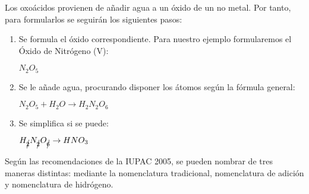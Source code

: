 Los oxoácidos provienen de añadir agua a un óxido de un no metal. Por tanto, para formularlos se seguirán los siguientes pasos:\\
\begin{enumerate}
	\item Se formula el óxido correspondiente. Para nuestro ejemplo formularemos el Óxido de Nitrógeno (V):
	\begin{center}
		$N_{2}O_5$
	\end{center}
	\item Se le añade agua, procurando disponer los átomos según la fórmula general:
	\begin{center}
		$N_{2}O_5+ H_{2}O \rightarrow H_{2}N_{2}O_6$	
	\end{center}
	\item Se simplifica si se puede:
	\begin{center}
		$H_{\cancel{2}}N_{\cancel{2}}O_{\cancel{6}} \rightarrow HNO_3$
	\end{center}
\end{enumerate}
Según las recomendaciones de la IUPAC 2005, se pueden nombrar de tres maneras distintas: mediante la nomenclatura tradicional, nomenclatura de adición y nomenclatura de hidrógeno.\\
